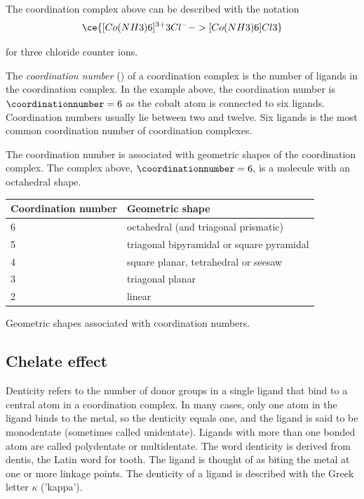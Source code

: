 \documentclass[../mit-general-chemistry.tex]{subfiles}
\begin{document}
The coordination complex above can be described with the notation
\begin{equation}
  \ce{[Co(NH3)6]^{3+} 3Cl^- -> [Co(NH3)6]Cl3}
\end{equation}

for three chloride counter ions.

\paragraphbreak

The {\em coordination number} (\coordinationnumber) of a coordination
complex is the number of ligands in the coordination complex. In the
example above, the coordination number is $\coordinationnumber = 6$ as
the cobalt atom is connected to six  ligands. Coordination
numbers usually lie between two and twelve. Six ligands is the most
common coordination number of coordination complexes.


The coordination number is associated with geometric shapes of the
coordination complex. The  complex above,
$\coordinationnumber = 6$, is a molecule with an octahedral shape.


\begin{htable}
  \begin{center}
    \begin{tabularx}{.67\textwidth}{p{2cm}X}
      Coordination number & Geometric shape \\
      \midrule
      6 & octahedral (and triagonal prismatic) \\
      5 & triagonal bipyramidal or square pyramidal \\
      4 & square planar, tetrahedral or seesaw \\
      3 & triagonal planar \\
      2 & linear \\
    \end{tabularx}
  \end{center}
  \caption{Geometric shapes associated with coordination numbers.}
\end{htable}



\subsection{Chelate effect}

Denticity refers to the number of donor groups in a single ligand that
bind to a central atom in a coordination complex. In many cases, only
one atom in the ligand binds to the metal, so the denticity equals
one, and the ligand is said to be monodentate (sometimes called
unidentate). Ligands with more than one bonded atom are called
polydentate or multidentate. The word denticity is derived from
dentis, the Latin word for tooth. The ligand is thought of as biting
the metal at one or more linkage points. The denticity of a ligand is
described with the Greek letter $\kappa$ ('kappa').
\end{document}
